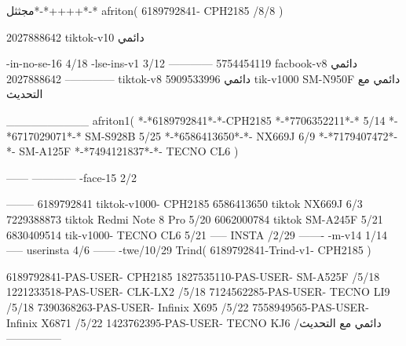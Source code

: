 مجثثل*-*++++*-*
afriton(
6189792841- CPH2185  /8/8
)

2027888642 tiktok-v10
دائمي

-in-no-se-16 4/18
-lse-ins-v1 3/12
------------
5754454119 facbook-v8
دائمي
--------------
2027888642 tiktok-v8
دائمي
5909533996 tik-v1000  SM-N950F
دائمي مع التحديث

__________
afriton1(
*-*6189792841*-*-CPH2185
*-*7706352211*-* 5/14
*-*6717029071*-*  SM-S928B 5/25
*-*6586413650*-*- NX669J  6/9
*-*7179407472*-*-  SM-A125F \5
*-*7494121837*-*-  TECNO CL6  \5
)


------
------------
-face-15 2/2

--------
6189792841 tiktok-v1000- CPH2185 
6586413650 tiktok NX669J  6/3
7229388873 tiktok Redmi Note 8 Pro   5/20
6062000784 tiktok SM-A245F   5/21
6830409514 tik-v1000- TECNO CL6  5/21
-----
 INSTA /2/29
-------
-m-v14 1/14
-----
userinsta 4/6
------
-twe/10/29
Trind(
6189792841-Trind-v1- CPH2185 
)

6189792841-PAS-USER- CPH2185 
1827535110-PAS-USER- SM-A525F  /5/18
1221233518-PAS-USER-  CLK-LX2  /5/18
7124562285-PAS-USER-  TECNO LI9  /5/18
7390368263-PAS-USER-  Infinix X695  /5/22
7558949565-PAS-USER-  Infinix X6871  /5/22
1423762395-PAS-USER- TECNO KJ6  /دائمي مع التحديث
    ---------------
